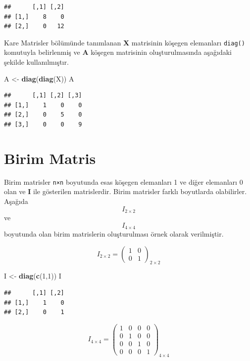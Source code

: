 \documentclass[
]{book}
\newenvironment{Shaded}{\begin{snugshade}}{\end{snugshade}}
\newcommand{\DecValTok}[1]{\textcolor[rgb]{0.00,0.00,0.81}{#1}}
\newcommand{\FunctionTok}[1]{\textcolor[rgb]{0.13,0.29,0.53}{\textbf{#1}}}
\newcommand{\NormalTok}[1]{#1}
\newcommand{\OtherTok}[1]{\textcolor[rgb]{0.56,0.35,0.01}{#1}}
\begin{document}
\begin{verbatim}
##      [,1] [,2]
## [1,]    8    0
## [2,]    0   12
\end{verbatim}

Kare Matrisler bölümünde tanımlanan \textbf{X} matrisinin köşegen elemanları \texttt{diag()} komutuyla belirlenmiş ve \textbf{A} köşegen matrisinin oluşturulmasında aşağıdaki şekilde kullanılmıştır.

\begin{Shaded}
\begin{Highlighting}[]
\NormalTok{A }\OtherTok{\textless{}{-}} \FunctionTok{diag}\NormalTok{(}\FunctionTok{diag}\NormalTok{(X)) }
\NormalTok{A }
\end{Highlighting}
\end{Shaded}

\begin{verbatim}
##      [,1] [,2] [,3]
## [1,]    1    0    0
## [2,]    0    5    0
## [3,]    0    0    9
\end{verbatim}

\section{Birim Matris}\label{birim-matris}

Birim matrisler \texttt{n×n} boyutunda esas köşegen elemanları 1 ve diğer elemanları 0 olan ve \textbf{I} ile gösterilen matrislerdir. Birim matrisler farklı boyutlarda olabilirler. Aşağıda \[I_{2×2}\] ve \[I_{4×4}\] boyutunda olan birim matrislerin oluşturulması örnek olarak verilmiştir.

\[I_{2×2} =
  \begin{pmatrix}
1 & 0 \\
0 & 1  
\end{pmatrix}_{2×2}\]

\begin{Shaded}
\begin{Highlighting}[]
\NormalTok{I }\OtherTok{\textless{}{-}} \FunctionTok{diag}\NormalTok{(}\FunctionTok{c}\NormalTok{(}\DecValTok{1}\NormalTok{,}\DecValTok{1}\NormalTok{)) }
\NormalTok{I }
\end{Highlighting}
\end{Shaded}

\begin{verbatim}
##      [,1] [,2]
## [1,]    1    0
## [2,]    0    1
\end{verbatim}

\[I_{4×4} =
  \begin{pmatrix}
1 & 0 & 0 & 0 \\
0 & 1 & 0 & 0 \\
0 & 0 & 1 & 0 \\
0 & 0 & 0 & 1
\end{pmatrix}_{4×4}\]
\end{document}
